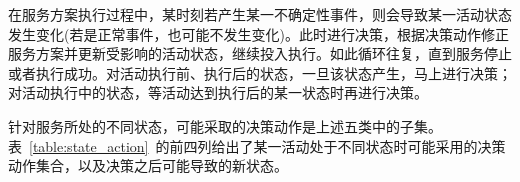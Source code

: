 在服务方案执行过程中，某时刻若产生某一不确定性事件，则会导致某一活动状态发生变化(若是正常事件，也可能不发生变化)。此时进行决策，根据决策动作修正服务方案并更新受影响的活动状态，继续投入执行。如此循环往复，直到服务停止或者执行成功。对活动执行前、执行后的状态，一旦该状态产生，马上进行决策；对活动执行中的状态，等活动达到执行后的某一状态时再进行决策。


针对服务所处的不同状态，可能采取的决策动作是上述五类中的子集。表~\ref{table:state_action}~的前四列给出了某一活动处于不同状态时可能采用的决策动作集合，以及决策之后可能导致的新状态。

